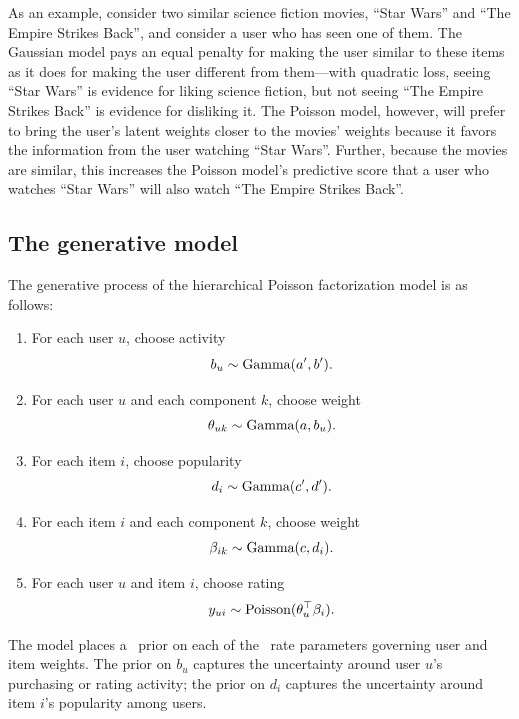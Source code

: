 \documentclass{sig-alternate}
\begin{document}
As an example, consider two similar science fiction movies, ``Star
Wars'' and ``The Empire Strikes Back'', and consider a user who has
seen one of them.  The Gaussian model pays an equal penalty for making
the user similar to these items as it does for making the user
different from them---with quadratic loss, seeing ``Star Wars'' is
evidence for liking science fiction, but not seeing ``The Empire
Strikes Back'' is evidence for disliking it.  The Poisson model,
however, will prefer to bring the user's latent weights closer to the
movies' weights because it favors the information from the user
watching ``Star Wars''. Further, because the movies are similar, this
increases the Poisson model's predictive score that a user who watches
``Star Wars'' will also watch ``The Empire Strikes Back''.


\subsection{The generative model}

The generative process of the hierarchical Poisson factorization model
is as follows:
\begin{enumerate}
\item For each user $u$, choose activity
  \begin{equation*}
    b_u \sim \textrm{Gamma}(a', b').
  \end{equation*}
\item For each user $u$ and each component $k$, choose weight
  \begin{equation*}
    \theta_{uk} \sim \textrm{Gamma}(a, b_u).
  \end{equation*}
\item For each item $i$, choose popularity
  \begin{equation*}
    d_i \sim \textrm{Gamma}(c', d').
  \end{equation*}
\item For each item $i$ and each component $k$, choose weight
  \begin{equation*}
    \beta_{ik} \sim \textrm{Gamma}(c, d_i).
  \end{equation*}
\item For each user $u$ and item $i$, choose rating
  \begin{equation*}
    y_{ui} \sim \textrm{Poisson}(\theta_u^\top \beta_i).
  \end{equation*}
\end{enumerate}
The model places a \gam~prior on each of the \gam~rate parameters
governing user and item weights. The prior on $b_u$ captures the
uncertainty around user $u$'s purchasing or rating activity; the prior
on $d_i$ captures the uncertainty around item $i$'s popularity among
users.
\end{document}
